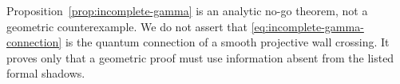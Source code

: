 \begin{remark}
Proposition~\ref{prop:incomplete-gamma} is an analytic no-go theorem, not a
geometric counterexample.  We do not assert that
\eqref{eq:incomplete-gamma-connection} is the quantum
connection of a smooth projective wall crossing.  It proves only that a
geometric proof must use information absent from the listed formal shadows.
\end{remark}
